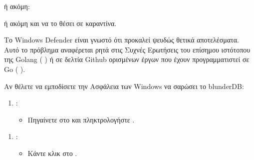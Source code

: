 \documentclass[letterpaper,10pt,greek]{sphinxmanual}
\begin{document}
\sphinxAtStartPar
ή ακόμη:

\begin{figure}[htbp]
\centering

\noindent{}
\end{figure}

\sphinxAtStartPar
ή ακόμη και να το θέσει σε καραντίνα.

\sphinxAtStartPar
Το Windows Defender είναι γνωστό ότι προκαλεί ψευδώς θετικά αποτελέσματα. Αυτό το πρόβλημα αναφέρεται ρητά στις Συχνές Ερωτήσεις του επίσημου ιστότοπου της Golang (  ) ή σε δελτία Github ορισμένων έργων που έχουν προγραμματιστεί σε Go (  ).

\sphinxAtStartPar
Αν θέλετε να εμποδίσετε την Ασφάλεια των Windows να σαρώσει το blunderDB:
\begin{enumerate}
%
\item {} 
\sphinxAtStartPar
{}:
\begin{itemize}
\item {} 
\sphinxAtStartPar
Πηγαίνετε στο  και πληκτρολογήστε .

\end{itemize}

\end{enumerate}

\begin{figure}[htbp]
\centering

\noindent{}
\end{figure}
\begin{enumerate}
%
\setcounter{enumi}{1}
\item {} 
\sphinxAtStartPar
{}:
\begin{itemize}
\item {} 
\sphinxAtStartPar
Κάντε κλικ στο .

\end{itemize}

\end{enumerate}
\end{document}
